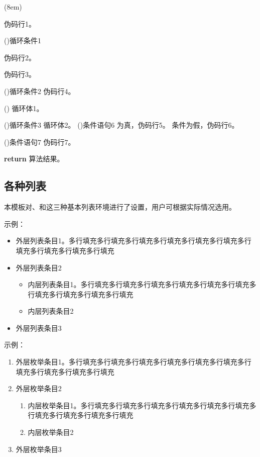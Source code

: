 \documentclass[QingNianC, vlined, timesmathnogreek]{nsfc}
\begin{document}
	\begin{algo}[!h](8em)
		\renewcommand{\algorithmcfname}{过程}  %
		\caption{algo环境临时修改伪码标签并调整宽度示例} \label{alg: algo环境修改伪码标签并调整宽度示例}
		伪码行1。
		
		\For(){循环条件1}{
			伪码行2。
			
			伪码行3。
			
			\DoWhile(){循环条件2}{
				伪码行4。
			}
			
			\Loop(){
				循环体1。
			}
			
			\Repeat(){循环条件3}{
				循环体2。
			}
			\eIf(){条件语句6}{
				为真，伪码行5。
			}{
				条件为假，伪码行6。
			}
			
			\If(){条件语句7}{
				伪码行7。
			}
		}
		\textbf{return} 算法结果。
	\end{algo}

	\clearpage
	\subsection{各种列表}

	本模板对、和这三种基本列表环境进行了设置，用户可根据实际情况选用。

	示例：

	\begin{itemize}
		\item 外层列表条目1。多行填充多行填充多行填充多行填充多行填充多行填充多行填充多行填充多行填充多行填充
		\item 外层列表条目2
		\begin{itemize}
			\item 内层列表条目1。多行填充多行填充多行填充多行填充多行填充多行填充多行填充多行填充多行填充多行填充
			\item 内层列表条目2
		\end{itemize}
		\item 外层列表条目3
	\end{itemize}

	\null

	示例：

	\begin{enumerate}
		\item 外层枚举条目1。多行填充多行填充多行填充多行填充多行填充多行填充多行填充多行填充多行填充多行填充
		\item 外层枚举条目2
		\begin{enumerate}
			\item 内层枚举条目1。多行填充多行填充多行填充多行填充多行填充多行填充多行填充多行填充多行填充多行填充
			\item 内层枚举条目2
		\end{enumerate}
		\item 外层枚举条目3
	\end{enumerate}
\end{document}
